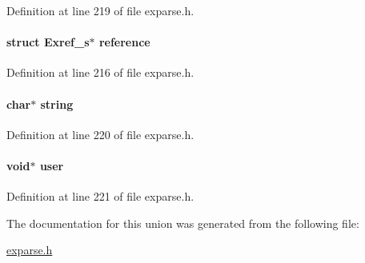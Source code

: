 Definition at line 219 of file exparse.\+h.

\hypertarget{union_e_x_s_t_y_p_e_a978c478f22a8ae8e29c509cbba1426e4}{
\paragraph[{reference}]{\setlength{\rightskip}{0pt plus 5cm}struct Exref\+\_\+s$\ast$ reference}}\label{union_e_x_s_t_y_p_e_a978c478f22a8ae8e29c509cbba1426e4}


Definition at line 216 of file exparse.\+h.

\hypertarget{union_e_x_s_t_y_p_e_aed1cfb225a5fb77461e7972691e68a72}{
\paragraph[{string}]{\setlength{\rightskip}{0pt plus 5cm}char$\ast$ string}}\label{union_e_x_s_t_y_p_e_aed1cfb225a5fb77461e7972691e68a72}


Definition at line 220 of file exparse.\+h.

\hypertarget{union_e_x_s_t_y_p_e_a5ab32084b1ccaf8aaa8a0c703b8853cf}{
\paragraph[{user}]{\setlength{\rightskip}{0pt plus 5cm}void$\ast$ user}}\label{union_e_x_s_t_y_p_e_a5ab32084b1ccaf8aaa8a0c703b8853cf}


Definition at line 221 of file exparse.\+h.



The documentation for this union was generated from the following file\+:\begin{DoxyCompactItemize}
\item 
\hyperlink{exparse_8h}{exparse.\+h}\end{DoxyCompactItemize}

